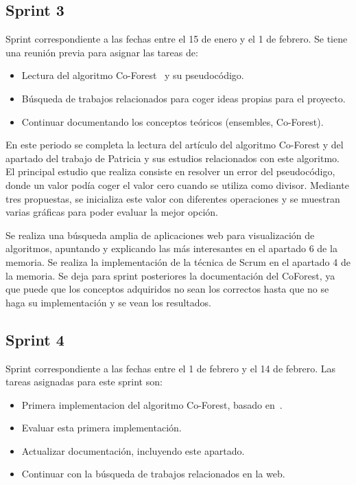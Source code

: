 \subsection{Sprint 3}
Sprint correspondiente a las fechas entre el 15 de enero y el 1 de febrero. Se tiene una reunión previa para asignar las tareas de: 
\begin{itemize}
	\item Lectura del algoritmo Co-Forest~\cite{IEEE:CoForest} y su pseudocódigo.
	\item Búsqueda de trabajos relacionados para coger ideas propias para el proyecto.
	\item Continuar documentando los conceptos teóricos (ensembles, Co-Forest).
\end{itemize}

En este periodo se completa la lectura del artículo del algoritmo Co-Forest y del apartado del trabajo de Patricia y sus estudios relacionados con este algoritmo. El principal estudio que realiza consiste en resolver un error del pseudocódigo, donde un valor podía coger el valor cero cuando se utiliza como divisor. Mediante tres propuestas, se inicializa este valor con diferentes operaciones y se muestran varias gráficas para poder evaluar la mejor opción.

Se realiza una búsqueda amplia de aplicaciones web para visualización de algoritmos, apuntando y explicando las más interesantes en el apartado 6 de la memoria.
Se realiza la implementación de la técnica de Scrum en el apartado 4 de la memoria.
Se deja para sprint posteriores la documentación del CoForest, ya que puede que los conceptos adquiridos no sean los correctos hasta que no se haga su implementación y se vean los resultados.

\subsection{Sprint 4}
Sprint correspondiente a las fechas entre el 1 de febrero y el 14 de febrero. Las tareas asignadas para este sprint son:
\begin{itemize}
	\item Primera implementacion del algoritmo Co-Forest, basado en~\cite{IEEE:CoForest}.
	\item Evaluar esta primera implementación.
	\item Actualizar documentación, incluyendo este apartado.
	\item Continuar con la búsqueda de trabajos relacionados en la web.
\end{itemize}

